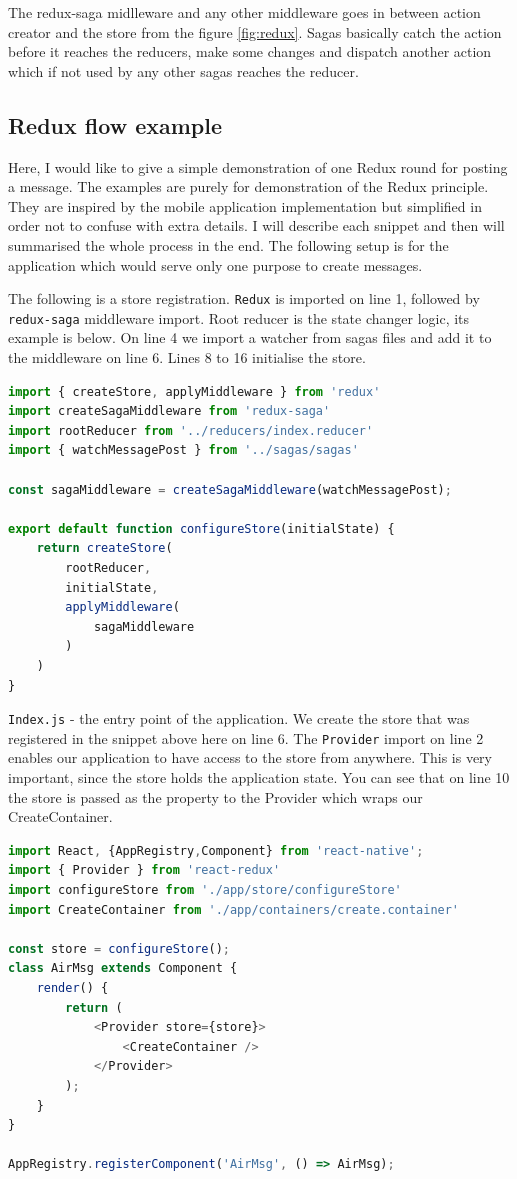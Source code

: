 \documentclass[thesis=M,english]{FITthesis}[2012/10/20]
\begin{document}
The redux-saga midlleware and any other middleware goes in between action creator and the store from the figure  \ref{fig:redux}. Sagas basically catch the action before it reaches the reducers, make some changes and dispatch another action which if not used by any other sagas reaches the reducer.

\subsection{Redux flow example}
Here, I would like to give a simple demonstration of one Redux round for posting a message. The examples are purely for demonstration of the Redux principle. They are inspired by the mobile application implementation but simplified in order not to confuse with extra details. I will describe each snippet and then will summarised the whole process in the end. The following setup is for the application which would serve only one purpose to create messages.

The following is a store registration. \verb|Redux| is imported on line 1, followed by \verb|redux-saga| middleware import. Root reducer is the state changer logic, its example is below.  On line 4 we import a watcher from sagas files and add it to the middleware on line 6. Lines 8 to 16 initialise the store.
\begin{lstlisting}[language=JavaScript]
import { createStore, applyMiddleware } from 'redux'
import createSagaMiddleware from 'redux-saga'
import rootReducer from '../reducers/index.reducer'
import { watchMessagePost } from '../sagas/sagas'

const sagaMiddleware = createSagaMiddleware(watchMessagePost);

export default function configureStore(initialState) {
    return createStore(
        rootReducer,
        initialState,
        applyMiddleware(
            sagaMiddleware
        )
    )
}
\end{lstlisting}

\verb|Index.js| - the entry point of the application. We create the store that was registered in the snippet above here on line 6. The \verb|Provider| import on line 2 enables our application to have access to the store from anywhere. This is very important, since the store holds the application state. You can see that on line 10 the store is passed as the property to the Provider which wraps our CreateContainer.

\begin{lstlisting}[language=JavaScript]
import React, {AppRegistry,Component} from 'react-native';
import { Provider } from 'react-redux'
import configureStore from './app/store/configureStore'
import CreateContainer from './app/containers/create.container'

const store = configureStore();
class AirMsg extends Component {
    render() {
        return (
            <Provider store={store}>
                <CreateContainer />
            </Provider>
        );
    }
}

AppRegistry.registerComponent('AirMsg', () => AirMsg);
\end{lstlisting}
\end{document}
